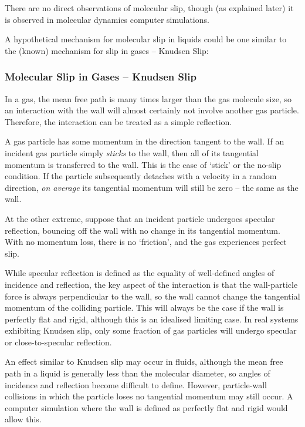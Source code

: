\documentclass[12pt, a4paper, twoside, openright]{book}
\begin{document}
There are no direct observations of molecular slip, though (as explained later) it is observed in molecular dynamics computer simulations.

A hypothetical mechanism for molecular slip in liquids could be one similar to the (known) mechanism for slip in gases -- Knudsen Slip:


\subsubsection{Molecular Slip in Gases -- Knudsen Slip}
In a gas, the mean free path is many times larger than the gas molecule size, so an interaction with the wall will almost certainly not involve another gas particle.  Therefore, the interaction can be treated as a simple reflection.

A gas particle has some momentum in the direction tangent to the wall.  If an incident gas particle simply \emph{sticks} to the wall, then all of its tangential momentum is transferred to the wall.  This is the case of `stick' or the no-slip condition.  If the particle subsequently detaches with a velocity in a random direction, \emph{on average} its tangential momentum will still be zero -- the same as the wall.

At the other extreme, suppose that an incident particle undergoes specular reflection, bouncing off the wall with no change in its tangential momentum.  With no momentum loss, there is no `friction', and the gas experiences perfect slip.

While specular reflection is defined as the equality of well-defined angles of incidence and reflection, the key aspect of the interaction is that the wall-particle force is always perpendicular to the wall, so the wall cannot change the tangential momentum of the colliding particle.
This will always be the case if the wall is perfectly flat and rigid,
although this is an idealised limiting case.
In real systems exhibiting Knudsen slip, only some fraction of gas particles will undergo specular or close-to-specular reflection. 

An effect similar to Knudsen slip may occur in fluids, although the mean free path in a liquid is generally less than the molecular diameter, so angles of incidence and reflection become difficult to define.  However, particle-wall collisions in which the particle loses no tangential momentum may still occur.  A computer simulation where the wall is defined as perfectly flat and rigid would allow this.
\end{document}
